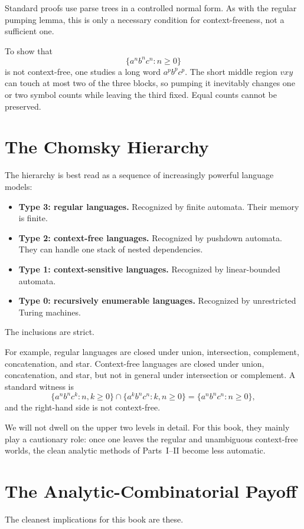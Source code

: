 Standard proofs use parse trees in a controlled normal form. As with the regular pumping lemma, this is only a necessary condition for context-freeness, not a sufficient one.

To show that
\[
  \{a^n b^n c^n : n \ge 0\}
\]
is not context-free, one studies a long word $a^p b^p c^p$. The short middle region $vxy$ can touch at most two of the three blocks, so pumping it inevitably changes one or two symbol counts while leaving the third fixed. Equal counts cannot be preserved.

\section{The Chomsky Hierarchy}

The hierarchy is best read as a sequence of increasingly powerful language models:
\begin{itemize}
  \item \textbf{Type 3: regular languages.} Recognized by finite automata. Their memory is finite.
  \item \textbf{Type 2: context-free languages.} Recognized by pushdown automata. They can handle one stack of nested dependencies.
  \item \textbf{Type 1: context-sensitive languages.} Recognized by linear-bounded automata.
  \item \textbf{Type 0: recursively enumerable languages.} Recognized by unrestricted Turing machines.
\end{itemize}
The inclusions are strict.

For example, regular languages are closed under union, intersection, complement, concatenation, and star. Context-free languages are closed under union, concatenation, and star, but not in general under intersection or complement. A standard witness is
\[
  \{a^n b^n c^k : n,k \ge 0\} \cap \{a^k b^n c^n : k,n \ge 0\} = \{a^n b^n c^n : n \ge 0\},
\]
and the right-hand side is not context-free.

We will not dwell on the upper two levels in detail. For this book, they mainly play a cautionary role: once one leaves the regular and unambiguous context-free worlds, the clean analytic methods of Parts~I--II become less automatic.

\section{The Analytic-Combinatorial Payoff}

The cleanest implications for this book are these.

